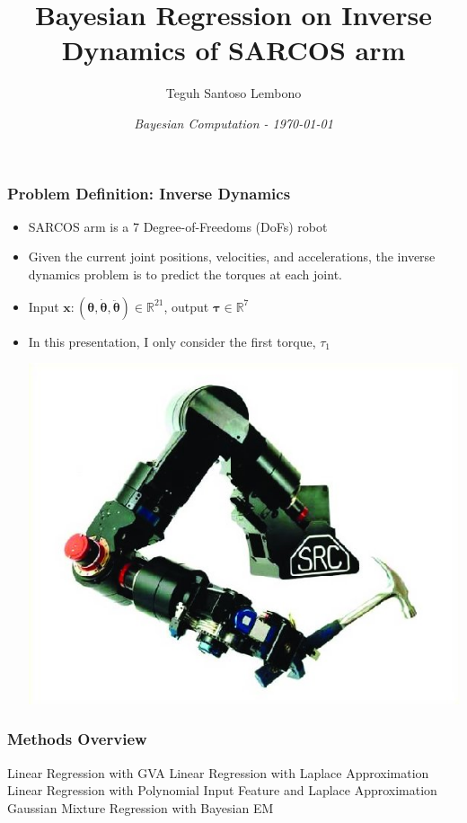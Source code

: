 \documentclass[xcolor=table]{beamer}
\title{\bf \huge Bayesian Regression on Inverse Dynamics of SARCOS arm}
\author{\Large Teguh Santoso Lembono}
\date{\it Bayesian Computation - \today}
\begin{document}
\maketitle


\begin{frame}

\frametitle{Problem Definition: Inverse Dynamics}

\centering

\begin{itemize}
\item SARCOS arm is a 7 Degree-of-Freedoms (DoFs) robot

\item Given the current joint positions, velocities, and accelerations, the inverse dynamics problem is to predict the torques at each joint. 

\item Input $\bm{x}:(\bm{\theta}, \dot{\bm{\theta}}, \ddot{\bm{\theta}}) \in \mathbb{R}^{21}$, output $\bm{\tau} \in \mathbb{R}^{7}$ 

\item In this presentation, I only consider the first torque, $\tau_1$

\includegraphics[height=0.4\columnwidth]{SARCOS_arm}

\end{itemize}

\end{frame}



\begin{frame}
\frametitle{Methods Overview}
\begin{outline}
\1 Linear Regression with GVA
\1 Linear Regression with Laplace Approximation
\1 Linear Regression with Polynomial Input Feature and Laplace Approximation
\1 Gaussian Mixture Regression with Bayesian EM
\end{outline}
\end{frame}
\end{document}
